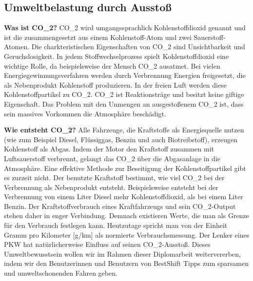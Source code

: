 \subsection{Umweltbelastung durch  Ausstoß}


\textbf{Was ist CO_{2}?}
CO_{2} wird umgangssprachlich Kohlenstoffdioxid genannt und ist die zusammengesetzt aus einem Kohlenstoff-Atom und zwei Sauerstoff-Atomen. 
Die charkteristischen Eigenschaften von CO_{2} sind Unsichtbarkeit und Geruchslosigkeit. 
In jedem Stoffwechselprozess spielt Kohlenstoffdioxid eine wichtige Rolle, da beispielsweise der Mensch CO_{2} ausatmet. 
Bei vielen Energiegewinnungsverfahren werden durch Verbrennung Energien freigesetzt, die als Nebenprodukt Kohlenstoff produzieren. 
In der freien Luft werden diese Kohlenstoffpartikel zu CO_{2}.
CO_{2} ist Reaktionsträge und besitzt keine giftige Eigenschaft. 
Das Problem mit den Unmengen an ausgestoßenem CO_{2} ist, dass sein massives Vorkommen die Atmosphäre beschädigt.

\textbf{Wie entsteht CO_{2}?}
Alle Fahrzeuge, die Kraftstoffe als Energiequelle nutzen 
(wie zum Beispiel Diesel, Flüssiggas, Benzin und auch Biotreibstoff), erzeugen Kohlenstoff als Abgas. 
Indem der Motor den Kraftstoff zusammen mit Luftsauerstoff verbrennt, gelangt das CO_{2} über die Abgasanlage in die Atmosphäre. 
Eine effektive Methode zur Beseitigung der Kohlenstoffpartikel gibt es zurzeit nicht. 
Der benutzte Kraftstoff bestimmt, wie viel CO_{2} bei der Verbrennung als Nebenprodukt entsteht.
Beispielsweise entsteht bei der Verbrennung von einem Liter Diesel mehr Kohlenstoffdioxid, als bei einem Liter Benzin.
Der Kraftstoffverbrauch eines Kraftfahrzeugs und sein CO_{2}-Output stehen daher in enger Verbindung.
Demnach existieren Werte, die man als Grenze für den Verbrauch festlegen kann. 
Heutzutage spricht man von der Einheit Gramm pro Kilometer [g/km] als normierte Verbrauchsmessung.
Der Lenker eines PKW hat natürlicherweise Einfluss auf seinen CO_{2}-Ausstoß. 
Dieses Umweltbewusstsein wollen wir im Rahmen dieser Diplomarbeit weitervererben, indem wir den Benutzerinnen und Benutzern 
von BestShift Tipps zum sparsamen und umweltschonenden Fahren geben.

